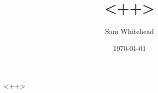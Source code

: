 \documentclass{article}
\title{<++>}
\author{Sam Whitehead}
\date{\mydate\today}
\begin{document}
    \maketitle
    \tableofcontents
    <++>
\end{document}
